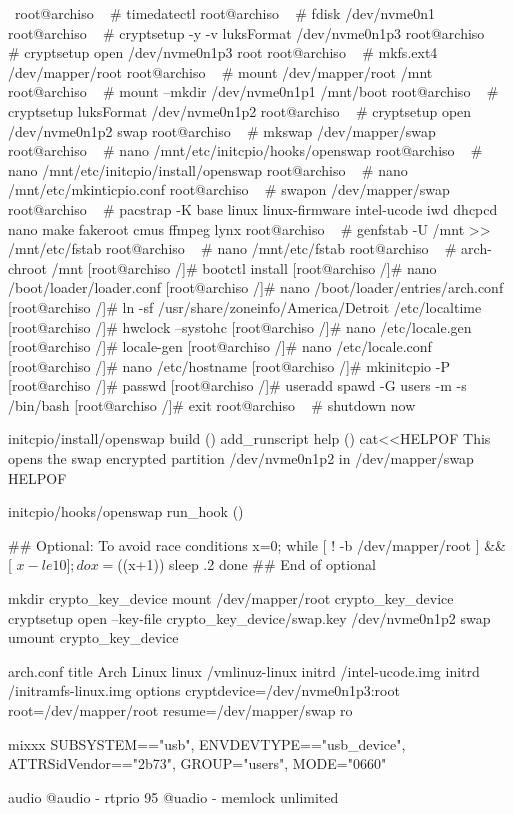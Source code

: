 \documentclass{article}[]
\begin{document}
\
root@archiso ~ # timedatectl
root@archiso ~ # fdisk /dev/nvme0n1 
root@archiso ~ # cryptsetup -y -v luksFormat /dev/nvme0n1p3
root@archiso ~ # cryptsetup open /dev/nvme0n1p3 root
root@archiso ~ # mkfs.ext4 /dev/mapper/root
root@archiso ~ # mount /dev/mapper/root /mnt
root@archiso ~ # mount --mkdir /dev/nvme0n1p1 /mnt/boot 
root@archiso ~ # cryptsetup luksFormat /dev/nvme0n1p2
root@archiso ~ # cryptsetup open /dev/nvme0n1p2 swap
root@archiso ~ # mkswap /dev/mapper/swap
root@archiso ~ # nano /mnt/etc/initcpio/hooks/openswap
root@archiso ~ # nano /mnt/etc/initcpio/install/openswap
root@archiso ~ # nano /mnt/etc/mkinticpio.conf
root@archiso ~ # swapon /dev/mapper/swap
root@archiso ~ # pacstrap -K base linux linux-firmware intel-ucode iwd dhcpcd nano make fakeroot cmus ffmpeg lynx
root@archiso ~ # genfstab -U /mnt >> /mnt/etc/fstab
root@archiso ~ # nano /mnt/etc/fstab
root@archiso ~ # arch-chroot /mnt
[root@archiso /]# bootctl install
[root@archiso /]# nano /boot/loader/loader.conf
[root@archiso /]# nano /boot/loader/entries/arch.conf
[root@archiso /]# ln -sf /usr/share/zoneinfo/America/Detroit /etc/localtime
[root@archiso /]# hwclock --systohc
[root@archiso /]# nano /etc/locale.gen
[root@archiso /]# locale-gen
[root@archiso /]# nano /etc/locale.conf
[root@archiso /]# nano /etc/hostname
[root@archiso /]# mkinitcpio -P
[root@archiso /]# passwd
[root@archiso /]# useradd spawd -G users -m -s /bin/bash
[root@archiso /]# exit
root@archiso ~ # shutdown now

initcpio/install/openswap
build ()
{
  add_runscript
}
help ()
{
cat<<HELPOF
  This opens the swap encrypted partition /dev/nvme0n1p2 in /dev/mapper/swap
HELPOF
}

initcpio/hooks/openswap
run_hook ()
{
  ## Optional: To avoid race conditions
  x=0;
  while [ ! -b /dev/mapper/root ] && [ $x -le 10 ]; do
    x=$((x+1))
    sleep .2
  done
  ## End of optional
  
  mkdir crypto_key_device
  mount /dev/mapper/root crypto_key_device
  cryptsetup open --key-file crypto_key_device/swap.key /dev/nvme0n1p2 swap
  umount crypto_key_device
}

arch.conf
title       Arch Linux
linux       /vmlinuz-linux
initrd      /intel-ucode.img
initrd      /initramfs-linux.img
options     cryptdevice=/dev/nvme0n1p3:root root=/dev/mapper/root resume=/dev/mapper/swap ro

mixxx
SUBSYSTEM=="usb",
ENV{DEVTYPE}=="usb_device",
ATTRS{idVendor}=="2b73",
GROUP="users",
MODE="0660"

audio
@audio	-	rtprio	95
@uadio	-	memlock	unlimited
\end{document}
